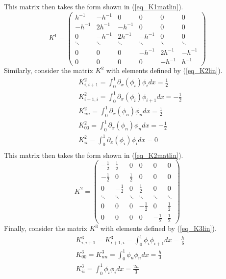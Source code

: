 \documentclass[11pt,fleqn]{article}
\theoremstyle{defstyle}
\begin{document}
This matrix then takes the form shown in (\ref{eq_K1matlin}).
\begin{equation}
K^1 = \begin{pmatrix}
h^{-1} & -h^{-1} & 0&0 & 0 &  0\\
-h^{-1} & 2h^{-1} & -h^{-1} & 0 & 0 &  0\\
0 & -h^{-1} & 2h^{-1} & -h^{-1} & 0 & 0  \\
\ddots & \ddots & \ddots & \ddots & \ddots & \ddots \\
0 & 0 & 0  & -h^{-1} & 2h^{-1}& -h^{-1} \\
0 & 0 & 0 & 0 & -h^{-1} & h^{-1}   
\end{pmatrix}
\label{eq_K1matlin}
\end{equation}
Similarly, consider the matrix $K^2$ with elements defined by (\ref{eq_K2lin}).
\begin{equation}
\begin{aligned}
&K^2_{i,i+1}=\int^1_0 \partial_x(\phi_i)\phi_{i}dx = \frac{1}{2}\\
&K^2_{i+1,i}=\int^1_0 \partial_x(\phi_i)\phi_{i+1}dx = -\frac{1}{2} \\
&K^2_{nn} = \int^1_0 \partial_x(\phi_n)\phi_{n}dx = \frac{1}{2} \\
&K^2_{00} = \int^1_0 \partial_x(\phi_n)\phi_{n}dx = -\frac{1}{2} \\
&K^2_{ii} = \int^1_0 \partial_x(\phi_i)\phi_{i}dx = 0 \\
\end{aligned}
\label{eq_K2lin}
\end{equation}
This matrix then takes the form shown in (\ref{eq_K2matlin}).
\begin{equation}
K^2 = \begin{pmatrix}
-\frac{1}{2} & \frac{1}{2} & 0& 0 & 0 &  0 \\
-\frac{1}{2} & 0 & \frac{1}{2} & 0 & 0 &  0\\
0 & -\frac{1}{2} & 0 & \frac{1}{2} & 0 & 0  \\
\ddots & \ddots & \ddots & \ddots & \ddots & \ddots \\
0 & 0 & 0  & -\frac{1}{2} & 0 & \frac{1}{2} \\
0 & 0 & 0 & 0 & -\frac{1}{2} & \frac{1}{2}   
\end{pmatrix}
\label{eq_K2matlin}
\end{equation}
Finally, consider the matrix $K^3$ with elements defined by (\ref{eq_K3lin}). 
\begin{equation}
\begin{aligned}
&K^3_{i,i+1}=K^3_{i+1,i}=\int^1_0 \phi_i\phi_{i+1}dx = \frac{h}{6} \\
&K^3_{00} = K^3_{nn} = \int^1_0 \phi_n\phi_{n}dx = \frac{h}{3} \\
&K^3_{ii} = \int^1_0 \phi_i\phi_{i}dx = \frac{2h}{3} \\
\end{aligned}
\label{eq_K3lin}
\end{equation}
\end{document}
